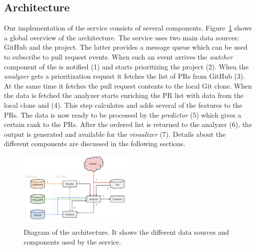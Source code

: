 \subsection{Architecture}
\label{sec:architecture}

Our implementation of the service consists of several components.
Figure~\ref{fig:architecture} shows a global overview of the architecture.
The \prioritizer service uses two main data sources: GitHub and the \ghtorrent project.
The latter provides a message queue which can be used to subscribe to pull request events.
When such an event arrives the \emph{watcher} component of the \prioritizer is notified (1) and starts prioritizing the project (2).
When the \emph{analyzer} gets a prioritization request it fetches the list of PRs from GitHub (3).
At the same time it fetches the pull request contents to the local Git clone.
When the data is fetched the analyzer starts enriching the PR list with data from the local clone and \ghtorrent (4).
This step calculates and adds several of the features to the PRs.
The data is now ready to be processed by the \emph{predictor} (5) which gives a certain rank to the PRs.
After the ordered list is returned to the analyzer (6), the output is generated and available for the \emph{visualizer} (7).
Details about the different components are discussed in the following sections.

\begin{figure}
  \centering
  \includegraphics[width=0.5\textwidth]{../figs/architecture.pdf}
  \caption[Diagram of the architecture]
   {Diagram of the architecture. It shows the different data sources and components used by the \prioritizer service.}
  \label{fig:architecture}
\end{figure}

